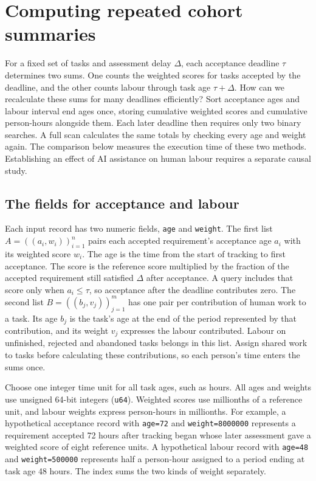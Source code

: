 \section{Computing repeated cohort summaries}
\label{sec:performance}

For a fixed set of tasks and assessment delay $\Delta$, each acceptance deadline $\tau$ determines two sums. One counts the weighted scores for tasks accepted by the deadline, and the other counts labour through task age $\tau+\Delta$. How can we recalculate these sums for many deadlines efficiently? Sort acceptance ages and labour interval end ages once, storing cumulative weighted scores and cumulative person-hours alongside them. Each later deadline then requires only two binary searches. A full scan calculates the same totals by checking every age and weight again. The comparison below measures the execution time of these two methods. Establishing an effect of AI assistance on human labour requires a separate causal study.

\subsection{The fields for acceptance and labour}

Each input record has two numeric fields, \texttt{age} and \texttt{weight}. The first list $A=((a_i,w_i))_{i=1}^{n}$ pairs each accepted requirement's acceptance age $a_i$ with its weighted score $w_i$. The age is the time from the start of tracking to first acceptance. The score is the reference score multiplied by the fraction of the accepted requirement still satisfied $\Delta$ after acceptance. A query includes that score only when $a_i\leq\tau$, so acceptance after the deadline contributes zero. The second list $B=((b_j,v_j))_{j=1}^{m}$ has one pair per contribution of human work to a task. Its age $b_j$ is the task's age at the end of the period represented by that contribution, and its weight $v_j$ expresses the labour contributed. Labour on unfinished, rejected and abandoned tasks belongs in this list. Assign shared work to tasks before calculating these contributions, so each person's time enters the sums once.

Choose one integer time unit for all task ages, such as hours. All ages and weights use unsigned 64-bit integers (\texttt{u64}). Weighted scores use millionths of a reference unit, and labour weights express person-hours in millionths. For example, a hypothetical acceptance record with \texttt{age=72} and \texttt{weight=8000000} represents a requirement accepted 72 hours after tracking began whose later assessment gave a weighted score of eight reference units. A hypothetical labour record with \texttt{age=48} and \texttt{weight=500000} represents half a person-hour assigned to a period ending at task age 48 hours. The index sums the two kinds of weight separately.

